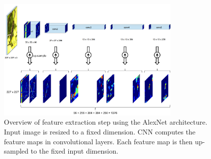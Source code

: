 \documentclass[10pt,twocolumn,letterpaper]{article}
\begin{document}
\begin{figure}
	\centering
	\includegraphics[height=6cm]{images/deeprf}
	\caption{Overview of feature extraction step using the AlexNet \cite{alexnet} architecture. Input image is resized to a fixed dimension. CNN computes the feature maps in convolutional layers. Each feature map is then up-sampled to the fixed input dimension.}
	\label{fig:method}
\end{figure}
\end{document}
